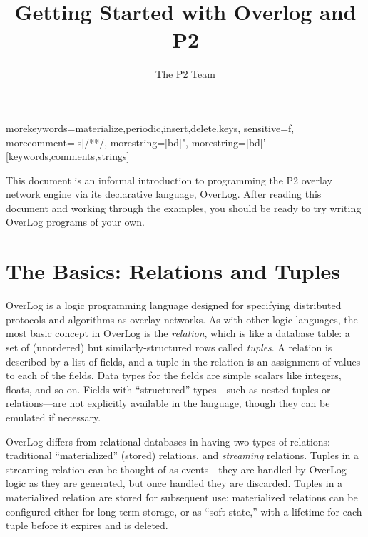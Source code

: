 \documentclass{article}
\title{Getting Started with Overlog and P2}
\author{The P2 Team}
\begin{document}
\date{}
\maketitle

%
  {morekeywords={materialize,periodic,insert,delete,keys},%
   sensitive=f,%
   morecomment=[s]{/*}{*/},%
   morestring=[bd]",%
   morestring=[bd]'%
  }[keywords,comments,strings]%


\newcommand{\ol}{OverLog\xspace}


This document is an informal introduction to programming the P2
overlay network engine via its declarative language, \ol.  After
reading this document and working through the examples, you should
be ready to try writing \ol programs of your own.

\section{The Basics: Relations and Tuples}
\ol is a logic programming language designed for specifying
distributed protocols and algorithms as overlay networks.  As with
other logic languages, the most basic concept in \ol is the {\em
  relation}, which is like a database table: a set of
(unordered) but similarly-structured rows called {\em tuples}.  A
relation is described by a list of fields, and a tuple in the
relation is an assignment of values to each of the fields.  Data types
for the fields are simple scalars like integers, floats, and so
on. Fields with ``structured'' types---such as
nested tuples or relations---are not explicitly available in the
language, though they can be emulated if necessary.

\ol differs from relational databases in having two types of
relations: traditional ``materialized'' (stored) relations, and
{\em streaming} relations.  Tuples in a streaming relation can be thought of
as events---they are handled by \ol logic as they are generated,
but once handled they are discarded.  Tuples in a materialized
relation are stored for subsequent use; materialized relations can be
configured either for long-term storage, or as ``soft state,'' with a
lifetime for each tuple before it expires and is deleted.
\end{document}
